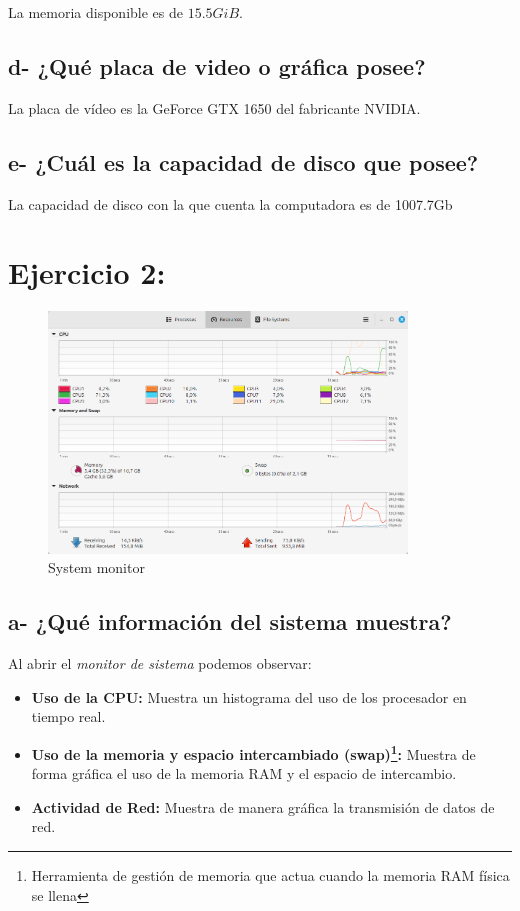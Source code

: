 \documentclass{article}
\begin{document}
La memoria disponible es de \(15.5 GiB\).

\subsection*{d- ¿Qué placa de video o gráfica posee?}

La placa de vídeo es la GeForce GTX 1650 del fabricante NVIDIA.

\subsection*{e- ¿Cuál es la capacidad de disco que posee?}
La capacidad de disco con la que cuenta la computadora es de 1007.7Gb


\section*{Ejercicio 2:}

\begin{figure}[h]
  \centering
  \includegraphics[width=0.85\textwidth]{resources/2.png}
  \caption{System monitor}
\end{figure}

\subsection*{a- ¿Qué información del sistema muestra?}

Al abrir el \textit{monitor de sistema} podemos observar:

\begin{itemize}
    \item \textbf{Uso de la CPU: } Muestra un histograma del uso de los procesador en tiempo real.
    \item \textbf{Uso de la memoria y espacio intercambiado (swap)\footnote{Herramienta de gestión de memoria que actua cuando la memoria RAM física se llena}: }
    Muestra de forma gráfica el uso de la memoria RAM y el espacio de intercambio.
    \item \textbf{Actividad de Red: } Muestra de manera gráfica la transmisión de  datos de red.
\end{itemize}
\end{document}
